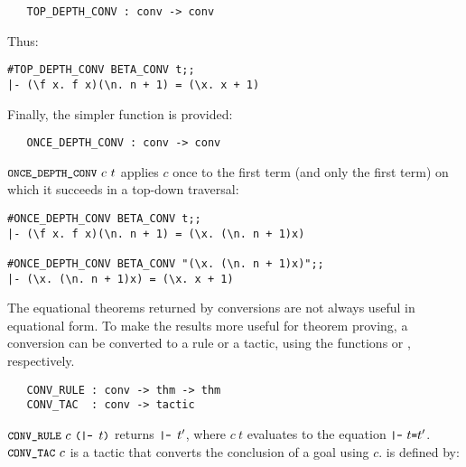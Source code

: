 \begin{boxed}
\begin{verbatim}
   TOP_DEPTH_CONV : conv -> conv
\end{verbatim}\end{boxed}

\noindent Thus:

\begin{session}\begin{verbatim}
#TOP_DEPTH_CONV BETA_CONV t;;
|- (\f x. f x)(\n. n + 1) = (\x. x + 1)
\end{verbatim}\end{session}

Finally, the simpler function  is provided:

\begin{boxed}
\begin{verbatim}
   ONCE_DEPTH_CONV : conv -> conv
\end{verbatim}\end{boxed}

\noindent $\ml{ONCE\_DEPTH\_CONV}\ c\ t$ applies $c$ once to the first
term (and only the first term)
on which it succeeds in a top-down traversal:

\begin{session}\begin{verbatim}
#ONCE_DEPTH_CONV BETA_CONV t;;
|- (\f x. f x)(\n. n + 1) = (\x. (\n. n + 1)x)

#ONCE_DEPTH_CONV BETA_CONV "(\x. (\n. n + 1)x)";;
|- (\x. (\n. n + 1)x) = (\x. x + 1)
\end{verbatim}\end{session}

The equational theorems returned by conversions are not always
useful in equational form.  To make the results more useful for theorem
proving,
a conversion can be converted to a rule or a tactic, using the functions
 or , respectively.


\begin{boxed}
\begin{verbatim}
   CONV_RULE : conv -> thm -> thm
   CONV_TAC  : conv -> tactic
\end{verbatim}\end{boxed}

\noindent $\ml{CONV\_RULE}\ c\ \ml{(|- }t\ml{)}$ returns $\ml{|- }t'$, where
$c\ t$ evaluates to the equation
$\ml{|-}\ t\ml{=}t'$.
$\ml{CONV\_TAC}\ c$ is a tactic that
converts the conclusion of a goal using $c$.  is defined by:

